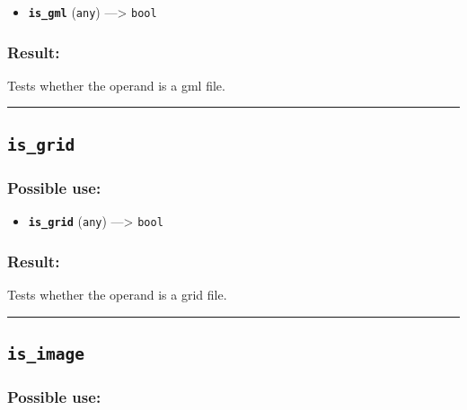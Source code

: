 \documentclass[]{book}
\providecommand{\tightlist}{%
  \setlength{\itemsep}{0pt}\setlength{\parskip}{0pt}}
\theoremstyle{definition}
\theoremstyle{definition}
\theoremstyle{definition}
\theoremstyle{remark}
\begin{document}
\begin{itemize}
\tightlist
\item
  \textbf{\texttt{is\_gml}} (\texttt{any}) ---\textgreater{}
  \texttt{bool}
\end{itemize}

\subsubsection{Result:}\label{result-282}

Tests whether the operand is a gml file.

\begin{center}\rule{0.5\linewidth}{\linethickness}\end{center}

\subsection{\texorpdfstring{\texttt{is\_grid}}{is\_grid}}\label{is_grid}

\subsubsection{Possible use:}\label{possible-use-293}

\begin{itemize}
\tightlist
\item
  \textbf{\texttt{is\_grid}} (\texttt{any}) ---\textgreater{}
  \texttt{bool}
\end{itemize}

\subsubsection{Result:}\label{result-283}

Tests whether the operand is a grid file.

\begin{center}\rule{0.5\linewidth}{\linethickness}\end{center}

\subsection{\texorpdfstring{\texttt{is\_image}}{is\_image}}\label{is_image}

\subsubsection{Possible use:}\label{possible-use-294}
\end{document}
